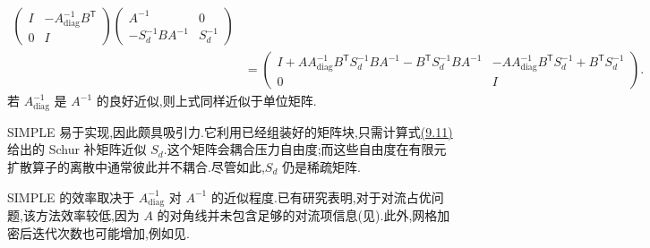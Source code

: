 \begin{example}
\[\begin{aligned}
  \begin{pmatrix}I&-A_{\mathrm{diag}}^{-1}B^{\mathsf T}\\0&I\end{pmatrix}
  \begin{pmatrix}A^{-1}&0\\-S_d^{-1}BA^{-1}&S_d^{-1}\end{pmatrix}\\
&=\begin{pmatrix}
 I+AA_{\mathrm{diag}}^{-1}B^{\mathsf T}S_d^{-1}BA^{-1}-B^{\mathsf T}S_d^{-1}BA^{-1}
 &-AA_{\mathrm{diag}}^{-1}B^{\mathsf T}S_d^{-1}+B^{\mathsf T}S_d^{-1}\\
 0&I
 \end{pmatrix}.
\end{aligned}
\]
若 $A_{\mathrm{diag}}^{-1}$ 是 $A^{-1}$ 的良好近似,则上式同样近似于单位矩阵.
\end{example}


\begin{note}[关于 SIMPLE]
\label{note:chapter9-simple-comments}
SIMPLE 易于实现,因此颇具吸引力.它利用已经组装好的矩阵块,只需计算式\hyperref[eq:chapter9-simple-schur]{(9.11)}给出的 Schur 补矩阵近似 $S_d$.这个矩阵会耦合压力自由度;而这些自由度在有限元扩散算子的离散中通常彼此并不耦合.尽管如此,$S_d$ 仍是稀疏矩阵.

SIMPLE 的效率取决于 $A_{\mathrm{diag}}^{-1}$ 对 $A^{-1}$ 的近似程度.已有研究表明,对于对流占优问题,该方法效率较低,因为 $A$ 的对角线并未包含足够的对流项信息(见\textcite{Elman2008b}).此外,网格加密后迭代次数也可能增加,例如见\textcite{SchoenKnecht2015}.
\end{note}



